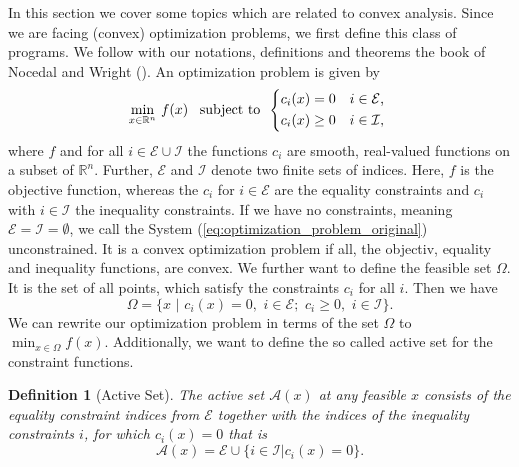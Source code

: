 \documentclass[abstracton]{scrreprt}
\newtheorem{definition}[theorem]{Definition}
\begin{document}
        In this section we cover some topics which are related to convex analysis. Since we are facing (convex) optimization problems, we first define this class of programs. We follow with our notations, definitions and theorems the book of Nocedal and Wright (\cite{Nocedal-Wright}). An optimization problem is given by
            \begin{equation} %
                \min_{x \in \mathbb{R}^{n}} \, f(x) \,\,\,\,\, \textnormal{subject to} \,\,\,
                \begin{dcases*}
                    c_{i}(x) = 0 & $i \in \mathcal{E}$, \\
                    c_{i}(x) \ge 0 & $i \in \mathcal{I}$,
                \end{dcases*}
                \label{eq:optimization_problem_original}
            \end{equation}
        where $f$ and for all $i \in \mathcal{E} \cup \mathcal{I}$ the functions $c_{i}$ are smooth, real-valued functions on a subset of $\mathbb{R}^{n}$. Further, $\mathcal{E}$ and $\mathcal{I}$ denote two finite sets of indices. Here, $f$ is the objective function, whereas the $c_{i}$ for $i \in \mathcal{E}$ are the equality constraints and $c_{i}$ with $i \in \mathcal{I}$ the inequality constraints. If we have no constraints, meaning $\mathcal{E} = \mathcal{I} = \emptyset$, we call the System (\ref{eq:optimization_problem_original}) unconstrained. It is a convex optimization problem if all, the objectiv, equality and inequality functions, are convex. We further want to define the feasible set $\Omega$. It is the set of all points, which satisfy the constraints $c_{i}$ for all $i$. Then we have
            $$
                \Omega = \{ x \,\, | \,\, c_{i}(x) = 0, \,\, i \in \mathcal{E}; \,\, c_{i} \ge 0, \,\, i \in \mathcal{I} \}.
            $$
        We can rewrite our optimization problem in terms of the set $\Omega$ to $\min_{x \in \Omega} f(x)$. Additionally, we want to define the so called active set for the constraint functions.
        \begin{definition}[Active Set] %
            \label{def:active_set}
            The active set $\mathcal{A}(x)$ at any feasible $x$ consists of the equality constraint indices from $\mathcal{E}$ together with the indices of the inequality constraints $i$, for which $c_{i}(x) = 0$ that is
                $$
                    \mathcal{A}(x) = \mathcal{E} \cup \{ i \in \mathcal{I} | c_{i}(x) = 0 \}.
                $$
        \end{definition}
\end{document}

